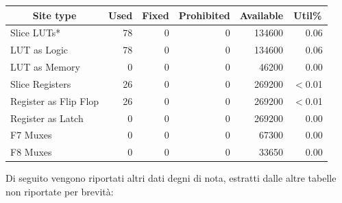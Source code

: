 \documentclass{article}
\begin{document}
\begin{center}
\begin{tabular}{|l|r|r|r|r|r|}
    \hline
    \multicolumn{1}{|c|}{\textbf{Site type}} & \multicolumn{1}{|c|}{\textbf{Used}} & \multicolumn{1}{|c|}{\textbf{Fixed}} & \multicolumn{1}{|c|}{\textbf{Prohibited}} & \multicolumn{1}{|c|}{\textbf{Available}} & \multicolumn{1}{|c|}{\textbf{Util}\%} \\
    \hline
    Slice LUTs* & 78 & 0 & 0 & 134600 & 0.06 \\
    \hspace{5pt} LUT as Logic & 78 & 0 & 0 & 134600 & 0.06 \\
    \hspace{5pt} LUT as Memory & 0 & 0 & 0 & 46200 & 0.00 \\
    Slice Registers & 26 & 0 & 0 & 269200 & $<$0.01 \\
    \hspace{5pt} Register as Flip Flop & 26 & 0 & 0 & 269200 & $<$0.01 \\
    \hspace{5pt} Register as Latch & 0 & 0 & 0 & 269200 & 0.00 \\
    F7 Muxes & 0 & 0 & 0 & 67300 & 0.00 \\
    F8 Muxes & 0 & 0 & 0 & 33650 & 0.00 \\
    \hline
\end{tabular}
\end{center}

\vspace{5pt}
Di seguito vengono riportati altri dati degni di nota, estratti dalle altre tabelle non riportate per brevità:
\end{document}
